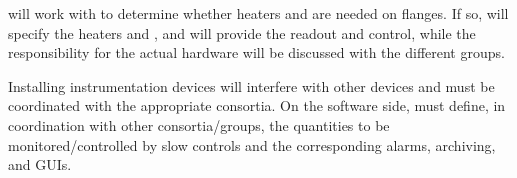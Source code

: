  will work with  to determine whether heaters and  are needed on flanges. If so,  will specify the heaters and  , and will provide the readout and control, while the responsibility for the actual hardware will be discussed with the different groups.

Installing instrumentation devices will interfere with other devices and must be coordinated with the appropriate consortia.  
On the software side,  must define, in coordination with other consortia/groups, the quantities to be monitored/controlled by slow controls and the corresponding alarms,
archiving, and GUIs. 



